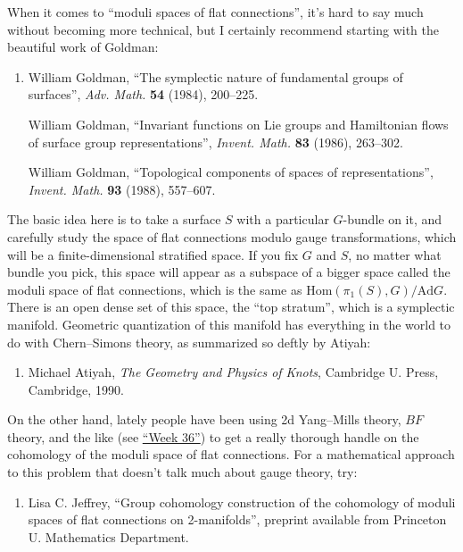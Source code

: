 \documentclass[12pt]{article}
\def\tightlist{}
\begin{document}
When it comes to ``moduli spaces of flat connections'', it's hard to say
much without becoming more technical, but I certainly recommend starting
with the beautiful work of Goldman:

\begin{enumerate}
\def\labelenumi{\arabic{enumi})}
\setcounter{enumi}{3}
\item
  William Goldman, ``The symplectic nature of fundamental groups of surfaces'',  
  \emph{Adv. Math.} \textbf{54} (1984), 200--225.

   William Goldman, ``Invariant functions on Lie groups and Hamiltonian flows of surface
  group representations'', \emph{Invent. Math.}
  \textbf{83} (1986), 263--302.

  William Goldman, ``Topological components of spaces of representations'', 
  \emph{Invent. Math.} \textbf{93} (1988), 557--607.
\end{enumerate}
\noindent
The basic idea here is to take a surface \(S\) with a particular
\(G\)-bundle on it, and carefully study the space of flat connections
modulo gauge transformations, which will be a finite-dimensional
stratified space. If you fix \(G\) and \(S\), no matter what bundle you
pick, this space will appear as a subspace of a bigger space called the
moduli space of flat connections, which is the same as
\(\mathrm{Hom}(\pi_1(S),G)/\mathrm{Ad} G\). There is an open dense set
of this space, the ``top stratum'', which is a symplectic manifold.
Geometric quantization of this manifold has everything in the world to
do with Chern--Simons theory, as summarized so deftly by Atiyah:

\begin{enumerate}
\def\labelenumi{\arabic{enumi})}
\setcounter{enumi}{4}
\tightlist
\item
   Michael Atiyah, \emph{The Geometry and Physics of Knots}, Cambridge
  U. Press, Cambridge, 1990.
\end{enumerate}

On the other hand, lately people have been using 2d Yang--Mills theory,
\(BF\) theory, and the like (see \protect\hyperlink{week36}{``Week
36''}) to get a really thorough handle on the cohomology of the moduli
space of flat connections. For a mathematical approach to this problem
that doesn't talk much about gauge theory, try:

\begin{enumerate}
\def\labelenumi{\arabic{enumi})}
\setcounter{enumi}{5}
\tightlist
\item
   Lisa C. Jeffrey, ``Group cohomology construction of the cohomology of moduli spaces of
  flat connections on 2-manifolds'', preprint
  available from Princeton U. Mathematics Department.
\end{enumerate}
\end{document}
